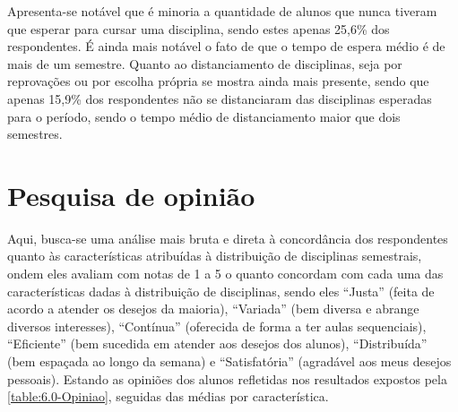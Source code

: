 \begin{apendicesenv}

  Apresenta-se notável que é minoria a quantidade de alunos que nunca tiveram que esperar para cursar uma disciplina, sendo estes apenas 25,6\% dos respondentes. É ainda mais notável o fato de que o tempo de espera médio é de mais de um semestre. Quanto ao distanciamento de disciplinas, seja por reprovações ou por escolha própria se mostra ainda mais presente, sendo que apenas 15,9\% dos respondentes não se distanciaram das disciplinas esperadas para o período, sendo o tempo médio de distanciamento maior que dois semestres.

  \section*{Pesquisa de opinião} \label{sec:Pesquisa de opinião}

  Aqui, busca-se uma análise mais bruta e direta à concordância dos respondentes quanto às características atribuídas à distribuição de disciplinas semestrais, ondem eles avaliam com notas de 1 a 5 o quanto concordam com cada uma das características dadas à distribuição de disciplinas, sendo eles ``Justa'' (feita de acordo a atender os desejos da maioria), ``Variada'' (bem diversa e abrange diversos interesses), ``Contínua'' (oferecida de forma a ter aulas sequenciais), ``Eficiente'' (bem sucedida em atender aos desejos dos alunos), ``Distribuída'' (bem espaçada ao longo da semana) e ``Satisfatória'' (agradável aos meus desejos pessoais). Estando as opiniões dos alunos refletidas nos resultados expostos pela \autoref{table:6.0-Opiniao}, seguidas das médias por característica.


\end{apendicesenv}
